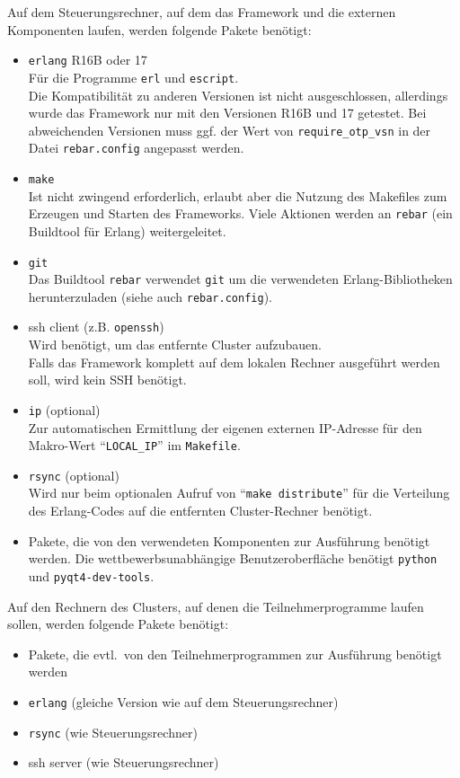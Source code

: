 \documentclass[a4paper, 12pt]{article}
\begin{document}
Auf dem Steuerungsrechner, auf dem das Framework und die externen Komponenten
laufen, werden folgende Pakete benötigt:
\begin{itemize}
  \item \texttt{erlang} R16B oder 17\\
        Für die Programme \texttt{erl} und \texttt{escript}.\\
        Die Kompatibilität zu anderen Versionen ist nicht ausgeschlossen,
        allerdings wurde das Framework nur mit den Versionen R16B und 17
        getestet.
        Bei abweichenden Versionen muss ggf. der Wert von
        \texttt{require\_otp\_vsn} in der Datei \texttt{rebar.config}
        angepasst werden.
  \item \texttt{make}\\
        Ist nicht zwingend erforderlich, erlaubt aber die Nutzung des Makefiles
        zum Erzeugen und Starten des Frameworks.
        Viele Aktionen werden an \texttt{rebar} (ein Buildtool für Erlang)
        weitergeleitet.
  \item \texttt{git}\\
        Das Buildtool \texttt{rebar} verwendet \texttt{git} um die verwendeten
        Erlang-Bibliotheken herunterzuladen (siehe auch \texttt{rebar.config}).
  \item ssh client (z.B. \texttt{openssh})\\
        Wird benötigt, um das entfernte Cluster aufzubauen.\\
        Falls das Framework komplett auf dem lokalen Rechner ausgeführt werden
        soll, wird kein SSH benötigt.
  \item \texttt{ip} (optional)\\
        Zur automatischen Ermittlung der eigenen externen IP-Adresse für den
        Makro-Wert ``\texttt{LOCAL\_IP}'' im \texttt{Makefile}.
  \item \texttt{rsync} (optional)\\
        Wird nur beim optionalen Aufruf von ``\texttt{make distribute}'' für die
        Verteilung des Erlang-Codes auf die entfernten Cluster-Rechner benötigt.
  \item Pakete, die von den verwendeten Komponenten zur Ausführung benötigt
        werden. Die wettbewerbsunabhängige Benutzeroberfläche benötigt
        \texttt{python} und \texttt{pyqt4-dev-tools}.
\end{itemize}

Auf den Rechnern des Clusters, auf denen die Teilnehmerprogramme laufen sollen,
werden folgende Pakete benötigt:
\begin{itemize}
  \item Pakete, die evtl.\ von den Teilnehmerprogrammen zur Ausführung benötigt
    werden
  \item \texttt{erlang} (gleiche Version wie auf dem Steuerungsrechner)
  \item \texttt{rsync} (wie Steuerungsrechner)
  \item ssh server (wie Steuerungsrechner)
\end{itemize}
\end{document}
